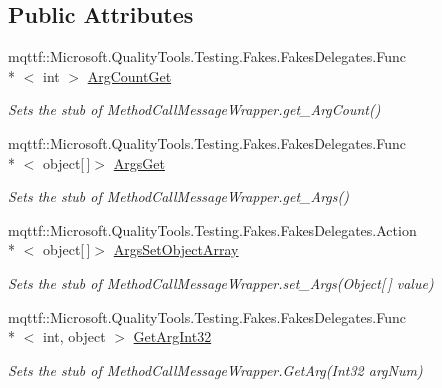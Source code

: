 \subsection*{Public Attributes}
\begin{DoxyCompactItemize}
\item 
mqttf\-::\-Microsoft.\-Quality\-Tools.\-Testing.\-Fakes.\-Fakes\-Delegates.\-Func\\*
$<$ int $>$ \hyperlink{class_system_1_1_runtime_1_1_remoting_1_1_messaging_1_1_fakes_1_1_stub_method_call_message_wrapper_a304f6473aeea8f838dcc9e85ad0e0441}{Arg\-Count\-Get}
\begin{DoxyCompactList}\small\item\em Sets the stub of Method\-Call\-Message\-Wrapper.\-get\-\_\-\-Arg\-Count()\end{DoxyCompactList}\item 
mqttf\-::\-Microsoft.\-Quality\-Tools.\-Testing.\-Fakes.\-Fakes\-Delegates.\-Func\\*
$<$ object\mbox{[}$\,$\mbox{]}$>$ \hyperlink{class_system_1_1_runtime_1_1_remoting_1_1_messaging_1_1_fakes_1_1_stub_method_call_message_wrapper_ac7c33f35ae41c7e1c9f60e9e4b895e78}{Args\-Get}
\begin{DoxyCompactList}\small\item\em Sets the stub of Method\-Call\-Message\-Wrapper.\-get\-\_\-\-Args()\end{DoxyCompactList}\item 
mqttf\-::\-Microsoft.\-Quality\-Tools.\-Testing.\-Fakes.\-Fakes\-Delegates.\-Action\\*
$<$ object\mbox{[}$\,$\mbox{]}$>$ \hyperlink{class_system_1_1_runtime_1_1_remoting_1_1_messaging_1_1_fakes_1_1_stub_method_call_message_wrapper_a08baa43cf648ea010a658e14c2c29629}{Args\-Set\-Object\-Array}
\begin{DoxyCompactList}\small\item\em Sets the stub of Method\-Call\-Message\-Wrapper.\-set\-\_\-\-Args(\-Object\mbox{[}$\,$\mbox{]} value)\end{DoxyCompactList}\item 
mqttf\-::\-Microsoft.\-Quality\-Tools.\-Testing.\-Fakes.\-Fakes\-Delegates.\-Func\\*
$<$ int, object $>$ \hyperlink{class_system_1_1_runtime_1_1_remoting_1_1_messaging_1_1_fakes_1_1_stub_method_call_message_wrapper_ad99933b39225e705a6b1424a1ca8ffc0}{Get\-Arg\-Int32}
\begin{DoxyCompactList}\small\item\em Sets the stub of Method\-Call\-Message\-Wrapper.\-Get\-Arg(\-Int32 arg\-Num)\end{DoxyCompactList}\item 

\end{DoxyCompactItemize}
